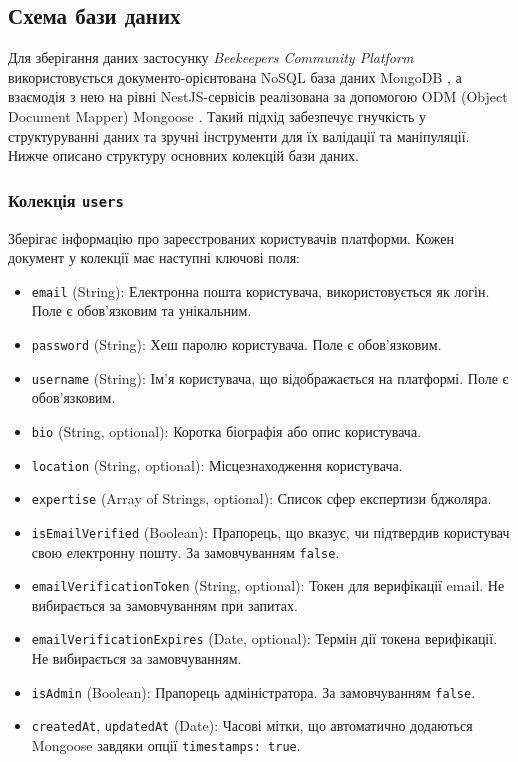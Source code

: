 \subsection{Схема бази даних}
\label{subsec:db_schema_detailed}
Для зберігання даних застосунку \textit{Beekeepers Community Platform} використовується документо-орієнтована NoSQL база даних MongoDB \cite{mongodb}, а взаємодія з нею на рівні NestJS-сервісів реалізована за допомогою ODM (Object Document Mapper) Mongoose \cite{mongoose}. Такий підхід забезпечує гнучкість у структуруванні даних та зручні інструменти для їх валідації та маніпуляції. Нижче описано структуру основних колекцій бази даних.

\subsubsection*{Колекція \texttt{users}}
Зберігає інформацію про зареєстрованих користувачів платформи. Кожен документ у колекції має наступні ключові поля:
\begin{itemize}
    \item \texttt{email} (String): Електронна пошта користувача, використовується як логін. Поле є обов'язковим та унікальним.
    \item \texttt{password} (String): Хеш паролю користувача. Поле є обов'язковим.
    \item \texttt{username} (String): Ім'я користувача, що відображається на платформі. Поле є обов'язковим.
    \item \texttt{bio} (String, optional): Коротка біографія або опис користувача.
    \item \texttt{location} (String, optional): Місцезнаходження користувача.
    \item \texttt{expertise} (Array of Strings, optional): Список сфер експертизи бджоляра.
    \item \texttt{isEmailVerified} (Boolean): Прапорець, що вказує, чи підтвердив користувач свою електронну пошту. За замовчуванням \texttt{false}.
    \item \texttt{emailVerificationToken} (String, optional): Токен для верифікації email. Не вибирається за замовчуванням при запитах.
    \item \texttt{emailVerificationExpires} (Date, optional): Термін дії токена верифікації. Не вибирається за замовчуванням.
    \item \texttt{isAdmin} (Boolean): Прапорець адміністратора. За замовчуванням \texttt{false}.
    \item \texttt{createdAt}, \texttt{updatedAt} (Date): Часові мітки, що автоматично додаються Mongoose завдяки опції \texttt{{timestamps: true}}.
\end{itemize}

